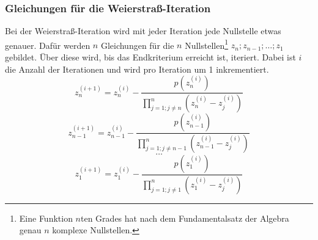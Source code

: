 \documentclass[12pt]{article}
\begin{document}
\subsubsection{Gleichungen für die Weierstraß-Iteration}
Bei der Weierstraß-Iteration wird mit jeder Iteration jede Nullstelle etwas genauer. Dafür werden $n$ Gleichungen für die $n$ Nullstellen\footnote{Eine Funktion $n$ten Grades hat nach dem Fundamentalsatz der Algebra genau $n$ komplexe Nullstellen.} $z_n;z_{n-1};\dots;z_1$ gebildet. Über diese wird, bis das Endkriterium erreicht ist, iteriert. Dabei ist $i$ die Anzahl der Iterationen und wird pro Iteration um 1 inkrementiert.
\[z_n^{(i+1)} = z_n^{(i)} - \frac{p(z_n^{(i)})}{\prod_{j=1;j\neq n}^{n}(z_n^{(i)}-z_j^{(i)})}\]
\[z_{n-1}^{(i+1)} = z_{n-1}^{(i)} - \frac{p(z_{n-1}^{(i)})}{\prod_{j=1;j\neq n-1}^{n}(z_{n-1}^{(i)}-z_j^{(i)})}\]
\vspace{0.25mm}
\[\dots\]
\[z_{1}^{(i+1)} = z_1^{(i)} - \frac{p(z_{1}^{(i)})}{\prod_{j=1;j\neq 1}^{n}(z_{1}^{(i)}-z_j^{(i)})}\]
\end{document}
